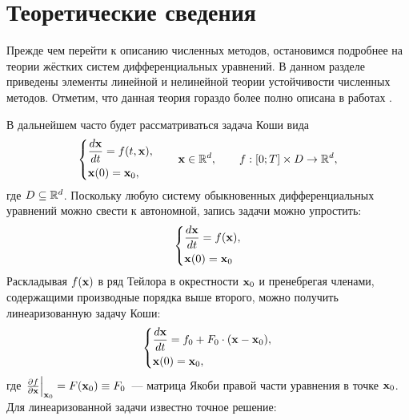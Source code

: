 \chapter{Теоретические сведения}
\label{chapter:theory} 

Прежде чем перейти к описанию численных методов, остановимся подробнее на теории жёстких систем дифференциальных уравнений.
В данном разделе приведены
элементы линейной и нелинейной теории устойчивости численных методов.
Отметим, что данная теория гораздо более полно описана в работах \cite{heirer1999solvingode2, lambert1991methods}.

В дальнейшем часто будет рассматриваться задача Коши вида
%
\begin{equation}
    \label{eq:initial_value_problem}
    \begin{dcases}
        \frac{d \mathbf{x}}{d t} = f(t, \mathbf{x}), \\
        \mathbf{x}(0) = \mathbf{x}_0,
    \end{dcases}
    \qquad
    \mathbf{x} \in \mathbb{R}^d, \qquad f: [0;T] \times D \to \mathbb{R}^d,
\end{equation}
%
где $ D \subseteq \mathbb{R}^d $.
Поскольку любую систему обыкновенных дифференциальных уравнений можно свести к автономной,
запись задачи можно упростить:
%
\begin{equation}
    \label{eq:autonomous_initial_value_problem}
    \begin{dcases}
        \frac{d \mathbf{x}}{d t} = f(\mathbf{x}), \\
        \mathbf{x}(0) = \mathbf{x}_0
    \end{dcases}
\end{equation}
%
Раскладывая $ f(\mathbf{x}) $ в ряд Тейлора в окрестности $ \mathbf{x}_0 $ и пренебрегая членами, содержащими производные порядка выше второго, можно получить линеаризованную задачу Коши:
%
\begin{equation}
    \label{eq:linearized_initial_value_problem}
    \begin{dcases}
        \frac{d \mathbf{x}}{d t} = f_0 + F_0 \cdot (\mathbf{x} - \mathbf{x}_0), \\
        \mathbf{x}(0) = \mathbf{x}_0,
    \end{dcases}
\end{equation}
%
где $ \left. \frac{\partial f}{\partial \mathbf{x}} \right|_{\mathbf{x}_0} = F(\mathbf{x}_0) \equiv F_0 $~--- матрица Якоби правой части уравнения в точке $ \mathbf{x}_0 $.
Для линеаризованной задачи известно точное решение:
